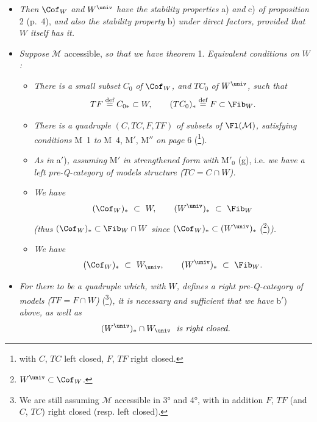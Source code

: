 
\begin{itemize}[leftmargin=2.5em]
\item[\circled{1}] \textit{Then} $\Cof_W$ \textit{and} $W^{\univ}$ \textit{have the stability properties} a) \textit{and} c) \textit{of proposition} 2 (p.~4), \textit{and also the stability property} b) \textit{under direct factors, provided that} $W$ \textit{itself has it.}

\item[\circled{2}] \textit{Suppose} $\mathcal{M}$ accessible, \textit{so that we have theorem} 1. \textit{Equivalent conditions on} $W$ \textit{:}


\begin{itemize}[leftmargin=2.5em]
\item[a)] \textit{There is a small subset} $C_0$ \textit{of} $\Cof_W$\textit{, and} $TC_0$ \textit{of} $W^{\univ}$\textit{, such that}
\[ TF \overset{\text{def}}{=} C_{0*} \subset W, \qquad (TC_0)_* \overset{\text{def}}{=} F \subset \Fib_W. \]

\item[a$'$)] \textit{There is a quadruple} $(C,TC,F,TF)$ \textit{of subsets of} $\Fl(\mathcal{M})$\textit{, satisfying conditions} M~1 \textit{to} M~4, M$'$, M$''$ \textit{on page} 6 (\footnote[10]{with $C$, $TC$ left closed, $F$, $TF$ right closed.}).

\item[a$''$)] \textit{As in} a$'$)\textit{, assuming} M$'$ \textit{in strengthened form with} M$'_0$ (g), i.e. \textit{we have a left pre-Q-category of models structure (}$TC = C \cap W$\textit{).}

\item[b)] \textit{We have}
\[ (\Cof_W)_* \ \subset\ W, \qquad (W^{\univ})_* \ \subset\ \Fib_W \]
\textit{(thus} $(\Cof_W)_* \subset \Fib_W \cap W$ \textit{since} $(\Cof_W)_* \subset (W^{\univ})_*$ (\footnote[11]{$W^{\univ} \subset \Cof_W$.})\textit{).}

\item[b$'$)] \textit{We have}
\[ (\Cof_W)_* \ \subset\ W_{\univ}, \qquad (W^{\univ})_* \ \subset\ \Fib_W. \]
\end{itemize}

\item[\circled{3}] \textit{For there to be a quadruple which, with} $W$\textit{, defines a right pre-Q-category of models (}$TF = F \cap W$\textit{)} (\footnote[12]{We are still assuming $\mathcal{M}$ accessible in 3° and 4°, with in addition $F$, $TF$ (and $C$, $TC$) right closed (resp. left closed).})\textit{, it is necessary and sufficient that we have} b$'$) \textit{above, as well as}
\[ (W^{\univ})_* \cap W_{\univ} \ \ \text{\itshape is right closed.} \]


\end{itemize}
